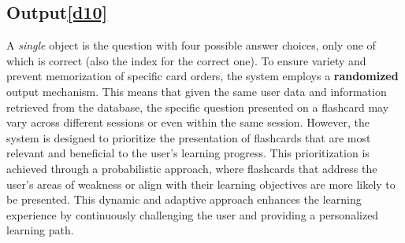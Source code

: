 \documentclass{article}
\begin{document}
\subsection{Output\hyperref[sec:input10]{[d10]}}
A \textit{single} object is the question with four possible answer choices, only one of which is correct (also the index for the correct one). To ensure variety and prevent memorization of specific card orders, the system employs a \textbf{randomized} output mechanism. This means that given the same user data and information retrieved from the database, the specific question presented on a flashcard may vary across different sessions or even within the same session. However, the system is designed to prioritize the presentation of flashcards that are most relevant and beneficial to the user's learning progress. This prioritization is achieved through a probabilistic approach, where flashcards that address the user's areas of weakness or align with their learning objectives are more likely to be presented. This dynamic and adaptive approach enhances the learning experience by continuously challenging the user and providing a personalized learning path.
\end{document}
